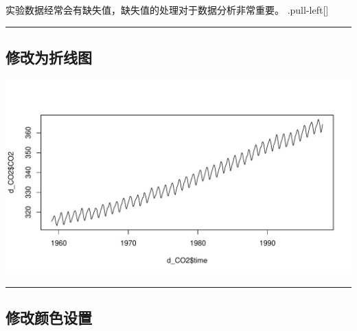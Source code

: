 \documentclass[
]{book}
\newenvironment{Shaded}{\begin{snugshade}}{\end{snugshade}}
\newcommand{\AttributeTok}[1]{\textcolor[rgb]{0.77,0.63,0.00}{#1}}
\newcommand{\FunctionTok}[1]{\textcolor[rgb]{0.00,0.00,0.00}{#1}}
\newcommand{\NormalTok}[1]{#1}
\newcommand{\SpecialCharTok}[1]{\textcolor[rgb]{0.00,0.00,0.00}{#1}}
\newcommand{\StringTok}[1]{\textcolor[rgb]{0.31,0.60,0.02}{#1}}
\begin{document}
实验数据经常会有缺失值，缺失值的处理对于数据分析非常重要。
.pull-left{[}{]}

\begin{center}\rule{0.5\linewidth}{0.5pt}\end{center}

\hypertarget{ux4feeux6539ux4e3aux6298ux7ebfux56fe}{%
\subsection{修改为折线图}\label{ux4feeux6539ux4e3aux6298ux7ebfux56fe}}

\begin{Shaded}
\end{Shaded}

\includegraphics[width=576px]{bookdown-demo_files/figure-latex/unnamed-chunk-56-1}

\begin{center}\rule{0.5\linewidth}{0.5pt}\end{center}

\hypertarget{ux4feeux6539ux989cux8272ux8bbeux7f6e}{%
\subsection{修改颜色设置}\label{ux4feeux6539ux989cux8272ux8bbeux7f6e}}

\begin{Shaded}
\end{Shaded}
\end{document}
